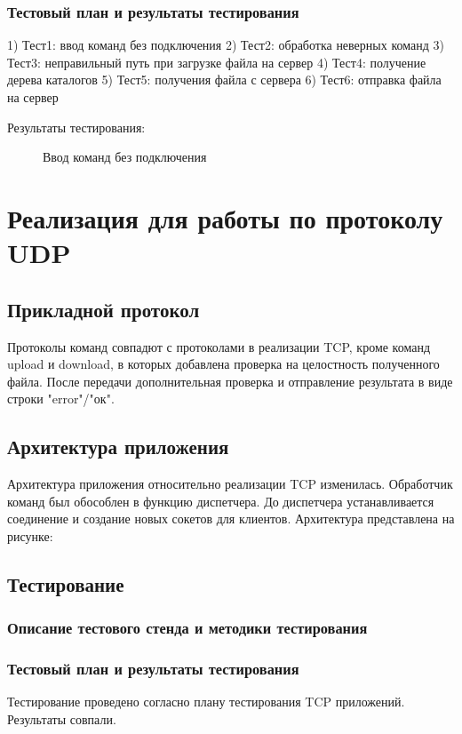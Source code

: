 \documentclass[12pt,a4paper]{report}
\begin{document}
\subsection{Тестовый план и результаты тестирования}
1) Тест1: ввод команд без подключения
2) Тест2: обработка неверных команд
3) Тест3: неправильный путь при загрузке файла на сервер
4) Тест4: получение дерева каталогов
5) Тест5: получения файла с сервера
6) Тест6: отправка файла на сервер

Результаты тестирования:
\begin{figure}[h!]
				\caption{Ввод команд без подключения}
				\label{img:test1}
			\end{figure}

\chapter{Реализация для работы по протоколу UDP}
\section{Прикладной протокол}
Протоколы команд совпадют с протоколами в реализации TCP, кроме команд upload и download, в которых добавлена проверка на целостность полученного файла. После передачи дополнительная проверка и отправление результата в виде строки "error"/"ок".

\section{Архитектура приложения}
Архитектура приложения относительно реализации TCP изменилась. Обработчик команд был обособлен в функцию диспетчера. До диспетчера устанавливается соединение и создание новых сокетов для клиентов.
Архитектура представлена на рисунке:

\section{Тестирование}
\subsection{Описание тестового стенда и методики тестирования}
\subsection{Тестовый план и результаты тестирования}
Тестирование проведено согласно плану тестирования TCP приложений. Результаты совпали.
\end{document}
